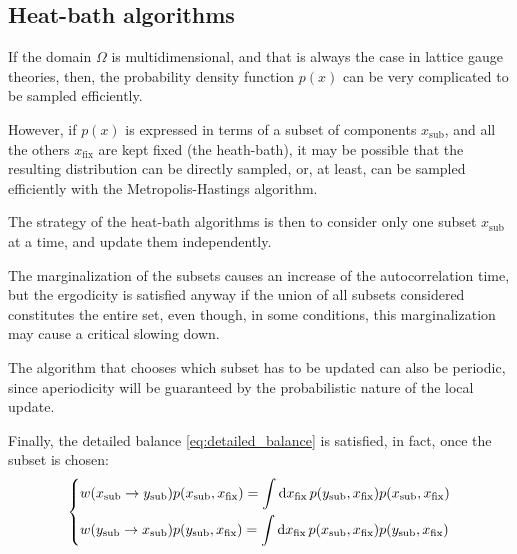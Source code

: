 \subsection*{Heat-bath algorithms}
If the domain $\Omega$ is multidimensional, and that is always the case in lattice gauge theories, then,
the probability density function $p(x)$ can be very complicated to be sampled efficiently.

However, if $p(x)$ is expressed in terms of a subset of components $x_\mathrm{sub}$, and all the others $x_\mathrm{fix}$ are kept fixed (the heath-bath),
it may be possible that the resulting distribution can be directly sampled, or, at least,
can be sampled efficiently with the Metropolis-Hastings algorithm.

The strategy of the heat-bath algorithms is then to consider only one subset $x_\mathrm{sub}$ at a time, and update them independently.

The marginalization of the subsets causes an increase of the autocorrelation time,
but the ergodicity is satisfied anyway if the union of all subsets considered constitutes the entire set,
even though, in some conditions, this marginalization may cause a critical slowing down.

The algorithm that chooses which subset has to be updated can also be periodic,
since aperiodicity will be guaranteed by the probabilistic nature of the local update.

Finally, the detailed balance \eqref{eq:detailed_balance} is satisfied, in fact, once the subset is chosen:
\[
    \begin{dcases}
        w(x_\mathrm{sub}\to y_\mathrm{sub})p(x_\mathrm{sub},x_\mathrm{fix}) = \int\mathrm dx_\mathrm{fix}\,p(y_\mathrm{sub},x_\mathrm{fix})p(x_\mathrm{sub},x_\mathrm{fix}) \\
        w(y_\mathrm{sub}\to x_\mathrm{sub})p(y_\mathrm{sub},x_\mathrm{fix}) = \int\mathrm dx_\mathrm{fix}\,p(x_\mathrm{sub},x_\mathrm{fix})p(y_\mathrm{sub},x_\mathrm{fix})
    \end{dcases}
\]

